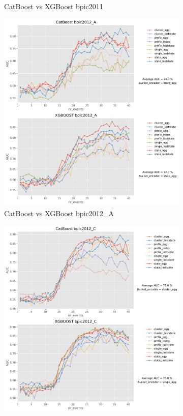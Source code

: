 \begin{figure}[!htb]
\begin{subfigure}{0.48\textwidth}
		\caption{CatBoost vs XGBoost bpic2011} \label{fig:b11}
	\end{subfigure}
	
	\medskip
	\begin{subfigure}{0.48\textwidth}
		\includegraphics[width=\linewidth]{images/catboost/graphs/bpic2012_A_CatBoost_xgboost.pdf}
		\caption{CatBoost vs XGBoost bpic2012\_A} \label{fig:b12a}
	\end{subfigure}\hspace*{\fill}
	\begin{subfigure}{0.48\textwidth}
		\includegraphics[width=\linewidth]{images/catboost/graphs/bpic2012_C_CatBoost_xgboost.pdf}

\end{subfigure}
\end{figure}
